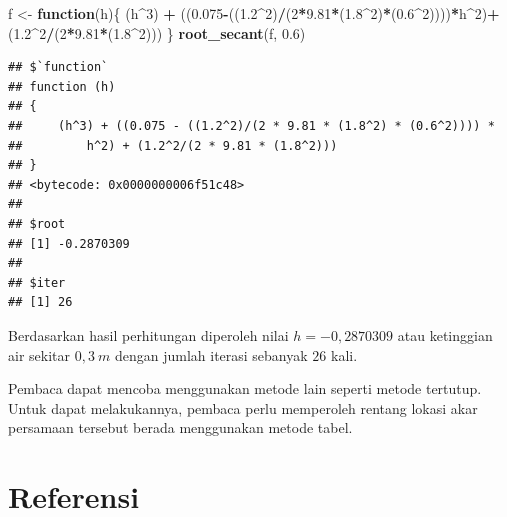 \documentclass[]{book}
\newenvironment{Shaded}{\begin{snugshade}}{\end{snugshade}}
\newcommand{\ControlFlowTok}[1]{\textcolor[rgb]{0.13,0.29,0.53}{\textbf{#1}}}
\newcommand{\DecValTok}[1]{\textcolor[rgb]{0.00,0.00,0.81}{#1}}
\newcommand{\FloatTok}[1]{\textcolor[rgb]{0.00,0.00,0.81}{#1}}
\newcommand{\KeywordTok}[1]{\textcolor[rgb]{0.13,0.29,0.53}{\textbf{#1}}}
\newcommand{\NormalTok}[1]{#1}
\newcommand{\OperatorTok}[1]{\textcolor[rgb]{0.81,0.36,0.00}{\textbf{#1}}}
\newcommand{\StringTok}[1]{\textcolor[rgb]{0.31,0.60,0.02}{#1}}
\theoremstyle{definition}
\theoremstyle{definition}
\theoremstyle{definition}
\theoremstyle{remark}
\begin{document}
\begin{Shaded}
\begin{Highlighting}[]
\NormalTok{f <-}\StringTok{ }\ControlFlowTok{function}\NormalTok{(h)\{}
\NormalTok{  (h}\OperatorTok{^}\DecValTok{3}\NormalTok{) }\OperatorTok{+}\StringTok{ }\NormalTok{((}\FloatTok{0.075}\OperatorTok{-}\NormalTok{((}\FloatTok{1.2}\OperatorTok{^}\DecValTok{2}\NormalTok{)}\OperatorTok{/}\NormalTok{(}\DecValTok{2}\OperatorTok{*}\FloatTok{9.81}\OperatorTok{*}\NormalTok{(}\FloatTok{1.8}\OperatorTok{^}\DecValTok{2}\NormalTok{)}\OperatorTok{*}\NormalTok{(}\FloatTok{0.6}\OperatorTok{^}\DecValTok{2}\NormalTok{))))}\OperatorTok{*}\NormalTok{h}\OperatorTok{^}\DecValTok{2}\NormalTok{)}\OperatorTok{+}\StringTok{ }\NormalTok{(}\FloatTok{1.2}\OperatorTok{^}\DecValTok{2}\OperatorTok{/}\NormalTok{(}\DecValTok{2}\OperatorTok{*}\FloatTok{9.81}\OperatorTok{*}\NormalTok{(}\FloatTok{1.8}\OperatorTok{^}\DecValTok{2}\NormalTok{)))}
\NormalTok{\}}
\KeywordTok{root_secant}\NormalTok{(f, }\FloatTok{0.6}\NormalTok{)}
\end{Highlighting}
\end{Shaded}

\begin{verbatim}
## $`function`
## function (h) 
## {
##     (h^3) + ((0.075 - ((1.2^2)/(2 * 9.81 * (1.8^2) * (0.6^2)))) * 
##         h^2) + (1.2^2/(2 * 9.81 * (1.8^2)))
## }
## <bytecode: 0x0000000006f51c48>
## 
## $root
## [1] -0.2870309
## 
## $iter
## [1] 26
\end{verbatim}

Berdasarkan hasil perhitungan diperoleh nilai \(h=-0,2870309\) atau ketinggian air sekitar \(0,3\ m\) dengan jumlah iterasi sebanyak \(26\) kali.

Pembaca dapat mencoba menggunakan metode lain seperti metode tertutup. Untuk dapat melakukannya, pembaca perlu memperoleh rentang lokasi akar persamaan tersebut berada menggunakan metode tabel.

\hypertarget{referensi-6}{%
\section{Referensi}\label{referensi-6}}
\end{document}
